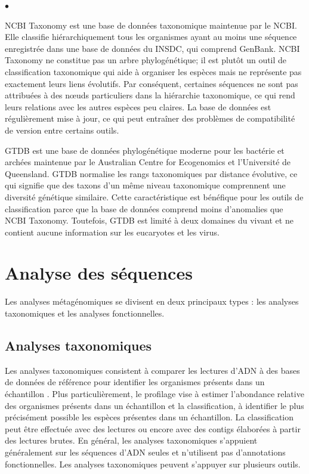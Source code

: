 \begin{list}{$\bullet$}{}
    \item NCBI Taxonomy \cite{ncbi_tax} est une base de données taxonomique maintenue par le NCBI.
        Elle classifie hiérarchiquement tous les organismes ayant au moins une séquence enregistrée
        dans une base de données du INSDC, qui comprend GenBank. NCBI Taxonomy ne constitue pas un
        arbre phylogénétique; il est plutôt un outil de classification taxonomique qui aide à
        organiser les espèces mais ne représente pas exactement leurs liens évolutifs. Par
        conséquent, certaines séquences ne sont pas attribuées à des n\oe uds particuliers dans
        la hiérarchie taxonomique, ce qui rend leurs relations avec les autres espèces peu claires.
        La base de données est régulièrement mise à jour, ce qui peut entraîner des problèmes
        de compatibilité de version entre certains outils.
    \item GTDB \cite{gtdb} est une base de données phylogénétique moderne pour les bactérie et
        archées maintenue par le Australian Centre for Ecogenomics et l'Université de Queensland.
        GTDB normalise les rangs taxonomiques par distance évolutive, ce qui signifie que des taxons
        d'un même niveau taxonomique comprennent une diversité génétique similaire. Cette
        caractéristique est bénéfique pour les outils de classification parce que la base de données
        comprend moins d'anomalies que NCBI Taxonomy. Toutefois, GTDB est limité à deux domaines du
        vivant et ne contient aucune information sur les eucaryotes et les virus.
\end{list}

\section{Analyse des séquences}
Les analyses métagénomiques se divisent en deux principaux types : les analyses taxonomiques et
les analyses fonctionnelles.

\subsection{Analyses taxonomiques}
Les analyses taxonomiques consistent à comparer les lectures d'ADN à des bases de données de
référence pour identifier les organismes présents dans un échantillon \cite{Navgire2022}. Plus
particulièrement, le profilage vise à estimer l'abondance relative des organismes présents dans un
échantillon et la classification, à identifier le plus précisément possible les espèces présentes
dans un échantillon. La classification peut être effectuée avec des lectures ou encore avec des
contigs élaborées à partir des lectures brutes. En général, les analyses taxonomiques s'appuient
généralement sur les séquences d'ADN seules et n'utilisent pas d'annotations fonctionnelles. Les
analyses taxonomiques peuvent s'appuyer sur plusieurs outils.

